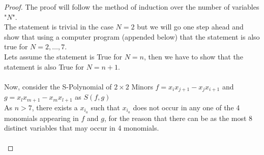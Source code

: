 \documentclass[12pt,a4paper]{article}
\theoremstyle{definition}
\begin{document}
\begin{proof}
The proof will follow the method of induction over the number of variables "$N$".\\
The statement is trivial in the case $N=2$ but we will go one step ahead and show that using a computer program (appended below) that the statement is also true for $N=2,\ldots , 7$.\\
Lets assume the statement is True for $N=n$, then we have to show that the statement is also True for $N=n+1$.\\
\\
Now, consider the S-Polynomial of $2\times 2$ Minors $f=x_{i}x_{j+1}-x_{j}x_{i+1}$ and $g=x_{l}x_{m+1}-x_{m}x_{l+1}$ as $S\left(f,g \right) $\\ 
As $n>7$, there exists a $x_{i_{a}}$ such that $x_{i_{a}}$ does not occur in any one of the 4 monomials appearing in $f$ and $g$, for the reason that there can be as the most 8 distinct variables that may occur in 4 monomials.  \\
\\


\end{proof}
\end{document}
